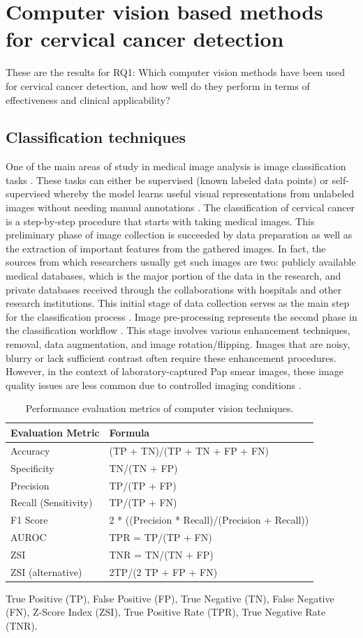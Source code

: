 \documentclass{svjour3}
\begin{document}
\section{Computer vision based methods for cervical cancer detection}
These are the results for RQ1: Which computer vision methods have been used for cervical cancer detection, and how well do they perform in terms of effectiveness and clinical applicability?
\subsection{Classification techniques}
One of the main areas of study in medical image analysis is image classification tasks \cite{ref11}. These tasks can either be supervised (known labeled data points) or self-supervised whereby the model learns useful visual representations from unlabeled images without needing manual annotations \cite{ref30,ref31}. The classification of cervical cancer is a step-by-step procedure that starts with taking medical images. This preliminary phase of image collection is succeeded by data preparation as well as the extraction of important features from the gathered images. In fact, the sources from which researchers usually get such images are two: publicly available medical databases, which is the major portion of the data in the research, and private databases received through the collaborations with hospitals and other research institutions. This initial stage of data collection serves as the main step for the classification process \cite{ref32}.
Image pre-processing represents the second phase in the classification workflow \cite{ref12}. This stage involves various enhancement techniques, removal, data augmentation, and image rotation/flipping. Images that are noisy, blurry or lack sufficient contrast often require these enhancement procedures. However, in the context of laboratory-captured Pap smear images, these image quality issues are less common due to controlled imaging conditions \cite{ref21}.
\begin{table}[htbp]
\centering
\caption{Performance evaluation metrics of computer vision techniques.}
\label{tab:metrics}
\begin{tabular}{ll}
\hline
Evaluation Metric & Formula \\
\hline
Accuracy & (TP + TN)/(TP + TN + FP + FN) \\
Specificity & TN/(TN + FP) \\
Precision & TP/(TP + FP) \\
Recall (Sensitivity) & TP/(TP + FN) \\
F1 Score & 2 * ((Precision * Recall)/(Precision + Recall)) \\
AUROC & TPR = TP/(TP + FN) \\
ZSI & TNR = TN/(TN + FP) \\
ZSI (alternative) & 2TP/(2 TP + FP + FN) \\
\hline
\end{tabular}
\end{table}
True Positive (TP), False Positive (FP), True Negative (TN), False Negative (FN), Z-Score Index (ZSI), True Positive Rate (TPR), True Negative Rate (TNR).
\end{document}
